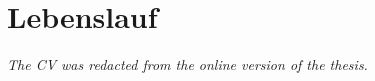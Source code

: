 \chapter[Curriculum vitae]{Lebenslauf}
\textit{The CV was redacted from the online version of the thesis.}

\clearpage
\pagestyle{plain}